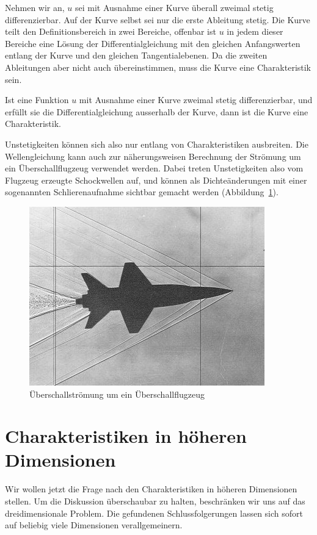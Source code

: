 Nehmen wir an, $u$ sei mit Ausnahme einer Kurve überall zweimal
stetig differenzierbar.
Auf der Kurve selbst sei nur die erste Ableitung stetig.
Die Kurve teilt den Definitionsbereich in zwei
Bereiche, offenbar ist $u$ in jedem dieser Bereiche eine 
Lösung der Differentialgleichung mit den gleichen Anfangswerten
entlang der Kurve und den gleichen Tangentialebenen.
Da die zweiten Ableitungen aber nicht auch übereinstimmen, muss
die Kurve eine Charakteristik sein.



\begin{satz}
Ist eine Funktion $u$ mit Ausnahme einer Kurve zweimal stetig
differenzierbar, und erfüllt sie die Differentialgleichung
ausserhalb der Kurve, dann ist die Kurve eine Charakteristik.
\end{satz}
Unstetigkeiten können sich also nur entlang von Charakteristiken
ausbreiten.
Die Wellengleichung kann auch zur näherungsweisen
Berechnung der Strömung um ein Überschallflugzeug verwendet werden.
Dabei treten Unstetigkeiten also vom Flugzeug erzeugte Schockwellen
auf, und können als Dichteänderungen mit einer
sogenannten Schlierenaufnahme sichtbar gemacht werden
(Abbildung~\ref{ueberschall2d}).

\begin{figure}
\begin{center}
\includegraphics[width=0.8\hsize]{../common/graphics/i-5-1}
\end{center}
\caption{Überschallströmung um ein Überschallflugzeug\label{ueberschall2d}}
\end{figure}

\section{Charakteristiken in höheren Dimensionen}
Wir wollen jetzt die Frage nach den Charakteristiken in höheren Dimensionen
stellen. Um die Diskussion überschaubar zu halten, beschränken wir uns auf
das dreidimensionale Problem. Die gefundenen Schlussfolgerungen 
lassen sich sofort auf beliebig viele Dimensionen verallgemeinern.

